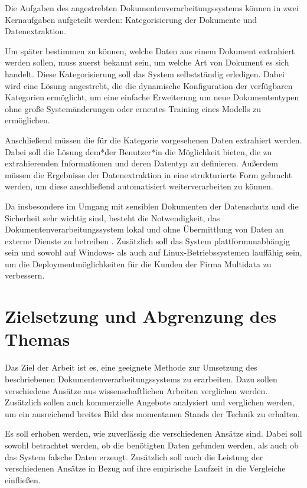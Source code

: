 Die Aufgaben des angestrebten Dokumentenverarbeitungssystems können in zwei Kernaufgaben aufgeteilt werden: Kategorisierung der Dokumente und Datenextraktion.

Um später bestimmen zu können, welche Daten aus einem Dokument extrahiert werden sollen, muss zuerst bekannt sein, um welche Art von Dokument es sich handelt. Diese Kategorisierung soll das System selbstständig erledigen. Dabei wird eine Lösung angestrebt, die die dynamische Konfiguration der verfügbaren Kategorien ermöglicht, um eine einfache Erweiterung um neue Dokumententypen ohne große Systemänderungen oder erneutes Training eines Modells zu ermöglichen.

Anschließend müssen die für die Kategorie vorgesehenen Daten extrahiert werden. Dabei soll die Lösung dem*der Benutzer*in die Möglichkeit bieten, die zu extrahierenden Informationen und deren Datentyp zu definieren. Außerdem müssen die Ergebnisse der Datenextraktion in eine strukturierte Form gebracht werden, um diese anschließend automatisiert weiterverarbeiten zu können.

Da insbesondere im Umgang mit sensiblen Dokumenten der Datenschutz und die Sicherheit sehr wichtig sind, besteht die Notwendigkeit, das Dokumentenverarbeitungssystem lokal und ohne Übermittlung von Daten an externe Dienste zu betreiben \cite{HuangYupan2022LPfD}. Zusätzlich soll das System plattformunabhängig sein und sowohl auf Windows- als auch auf Linux-Betriebssystemen lauffähig sein, um die Deploymentmöglichkeiten für die Kunden der Firma Multidata zu verbessern.

\section{Zielsetzung und Abgrenzung des Themas}
\label{sec:zielsetzung-und-abgrenzung}

Das Ziel der Arbeit ist es, eine geeignete Methode zur Umsetzung des beschriebenen Dokumentenverarbeitungssystems zu erarbeiten. Dazu sollen verschiedene Ansätze aus wissenschaftlichen Arbeiten verglichen werden. Zusätzlich sollen auch kommerzielle Angebote analysiert und verglichen werden, um ein ausreichend breites Bild des momentanen Stands der Technik zu erhalten.

Es soll erhoben werden, wie zuverlässig die verschiedenen Ansätze sind. Dabei soll sowohl betrachtet werden, ob die benötigten Daten gefunden werden, als auch ob das System falsche Daten erzeugt. Zusätzlich soll auch die Leistung der verschiedenen Ansätze in Bezug auf ihre empirische Laufzeit in die Vergleiche einfließen.

